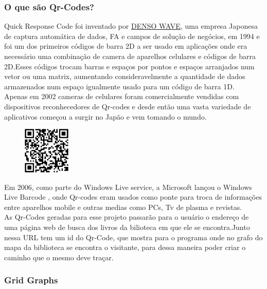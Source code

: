 \documentclass[a4paper,10pt]{article}
\begin{document}
	
      \subsubsection{O que são Qr-Codes?}
      Quick Response Code foi inventado por \href{http://www.denso-wave.com/}{DENSO WAVE}, uma empresa Japonesa de captura automática de dados, FA e campos de solução de negócios, em 1994 e foi um dos primeiros códigos de barra 2D
      a ser usado em aplicações onde era necessário uma combinação de camera de aparelhos celulares e códigos de barra 2D.\cite{barcode}Esses códigos trocam barras e espaços
      por pontos e espaços arranjados num vetor ou uma matrix, aumentando consideravelmente a quantidade de dados
      armazenados num espaço igualmente usado para um código de barra 1D.\\

      Apenas em 2002 cameras de celulares foram comercialmente vendidas com dispositivos reconhecedores de Qr-codes e desde
      então uma vasta variedade de aplicativos começou a surgir no Japão e vem tomando o mundo.
	\begin{figure}[H]
	\centering

      \includegraphics[width=0.20\textwidth]{./imgs/qrcode.png} 
      \end{figure}
	Em 2006, como parte do Windows Live service, a Microsoft lançou o Windows Live Barcode
      , onde Qr-codes eram usados como ponte para troca de informações entre aparelhos mobile e outras medias como PCs, Tv de plasma
      e revistas.\\
      
      As Qr-Codes geradas para esse projeto passarão para o usuário o endereço de uma página web de busca dos livros da 
      bilioteca em que ele se encontra.Junto nessa URL tem um id do Qr-Code, que mostra para o programa onde no grafo
      do mapa da biblioteca se encontra o visitante, para dessa maneira poder criar o caminho que o mesmo deve traçar.\\
      
      
      
      \subsubsection{Grid Graphs}
      
\end{document}
